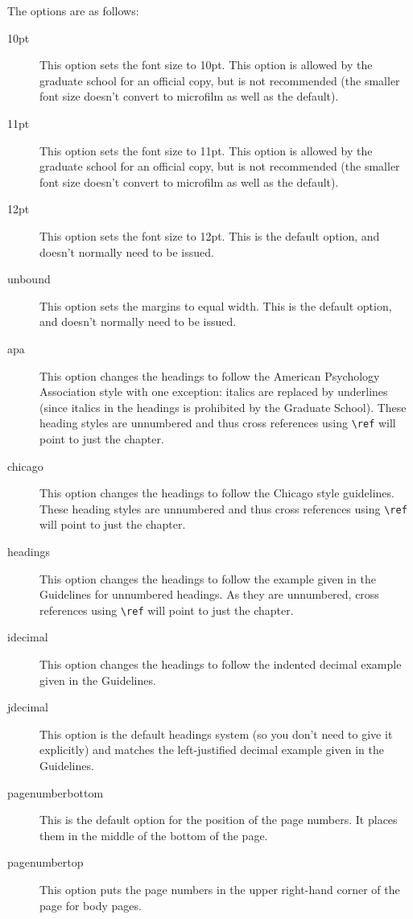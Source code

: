 \pagebreak[3]The options are as follows:
\begin{description}
\item[10pt]{This option sets the font size to 10pt.  This option is allowed by the graduate school for an official copy, but is not recommended (the smaller font size doesn't convert to microfilm as well as the default).}
\item[11pt]{This option sets the font size to 11pt.  This option is allowed by the graduate school for an official copy, but is not recommended (the smaller font size doesn't convert to microfilm as well as the default).}
\item[12pt]{This option sets the font size to 12pt.  This is the default option, and doesn't normally need to be issued.}
\item[unbound]{This option sets the margins to equal width.  This is the default option, and doesn't normally need to be issued.}
\item[apa]{This option changes the headings to follow the American Psychology Association style with one exception: italics are replaced by underlines (since italics in the headings is prohibited by the Graduate School).  These heading styles are unnumbered and thus cross references using \verb=\ref= will point to just the chapter.}
\item[chicago]{This option changes the headings to follow the Chicago style guidelines.  These heading styles are unnumbered and thus cross references using \verb=\ref= will point to just the chapter.}
\item[headings]{This option changes the headings to follow the example given in the Guidelines for unnumbered headings.  As they are unnumbered, cross references using \verb=\ref= will point to just the chapter.}
\item[idecimal]{This option changes the headings to follow the indented decimal example given in the Guidelines.}
\item[jdecimal]{This option is the default headings system (so you don't need to give it explicitly) and matches the left-justified decimal example given in the Guidelines.}
\item[pagenumberbottom]{This is the default option for the position of the page numbers.  It places them in the middle of the bottom of the page.}
\item[pagenumbertop]{This option puts the page numbers in the upper right-hand corner of the page for body pages.}
\end{description}

